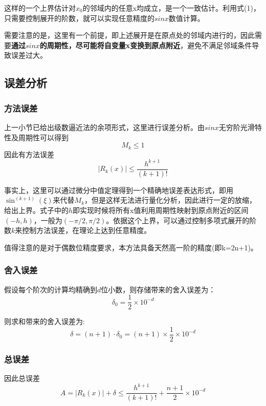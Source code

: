 \documentclass[UTF8]{ctexart}
\begin{document}
这样的一个上界估计对$x_0$的邻域内的任意x均成立，是一个一致估计。利用式(1)，只需要控制展开的阶数，就可以实现任意精度的$sinx$数值计算。

需要注意的是，这里有一个前提，即上述展开是在原点处的邻域内进行的，因此需要\textbf{通过$sinx$的周期性，尽可能将自变量x变换到原点附近}，避免不满足邻域条件导致误差过大。


\subsection{误差分析}

\subsubsection{方法误差}

上一小节已给出级数逼近法的余项形式，这里进行误差分析。由$sinx$无穷阶光滑特性及周期性可以得到$$M_k \leq 1$$
因此有方法误差
\begin{equation}
    |R_k(x)| \leq \frac{h^{k+1}}{(k+1)!}
\end{equation}

事实上，这里可以通过微分中值定理得到一个精确地误差表达形式，即用$\sin^{(k+1)}{(\xi)}$来代替$M_k$，但是这样无法进行量化分析，因此进行一定的放缩，给出上界。式子中的$h$即实现时候将所有x值利用周期性映射到原点附近的区间$(-h,h)$，一般为$(-\pi/2,\pi/2)$。依据这个上界，可以通过控制多项式展开的阶数$k$来控制方法误差，在理论上达到任意精度。

值得注意的是对于偶数位精度要求，本方法具备天然高一阶的精度(即k=2n+1)。

\subsubsection{舍入误差}

假设每个阶次的计算均精确到$d$位小数，则存储带来的舍入误差为：$$\delta_0 = \frac{1}{2}\times 10^{-d}$$

则求和带来的舍入误差为:
\begin{equation}
    \delta = (n+1) \cdot \delta_0 = (n+1) \times \frac{1}{2}\times 10^{-d}
\end{equation}

\subsubsection{总误差}

因此总误差
\begin{equation}
    A = |R_k(x)| + \delta \leq \frac{h^{k+1}}{(k+1)!} + \frac{n+1}{2} \times 10^{-d}
\end{equation}
\end{document}
